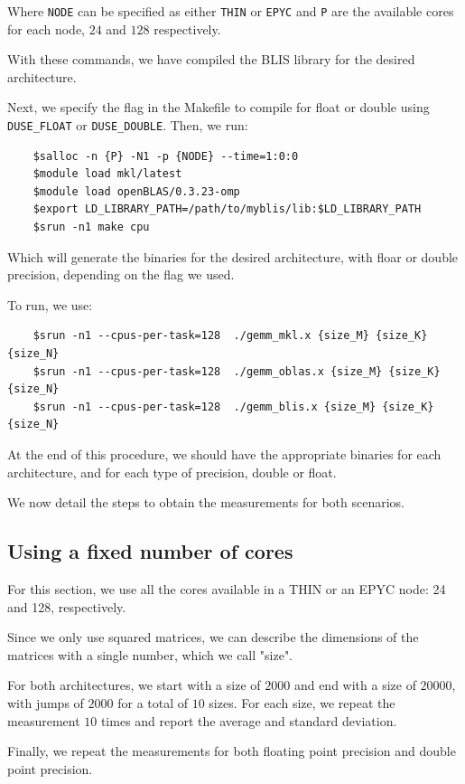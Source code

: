 \documentclass{report}
\begin{document}
Where \texttt{NODE} can be specified as either \texttt{THIN} or \texttt{EPYC} and 
\texttt{P} are the available cores for each node, $24$ and $128$ respectively.

With these commands, we have compiled the BLIS library for the desired 
architecture.

Next, we specify the flag in the Makefile to compile for float or double using 
\texttt{\-DUSE\_FLOAT} or \texttt{\-DUSE\_DOUBLE}. Then, we run:
\begin{verbatim}
    $salloc -n {P} -N1 -p {NODE} --time=1:0:0
    $module load mkl/latest
    $module load openBLAS/0.3.23-omp
    $export LD_LIBRARY_PATH=/path/to/myblis/lib:$LD_LIBRARY_PATH
    $srun -n1 make cpu
\end{verbatim}

Which will generate the binaries for the desired architecture, with floar or 
double precision, depending on the flag we used.

To run, we use: 
\begin{verbatim}
    $srun -n1 --cpus-per-task=128  ./gemm_mkl.x {size_M} {size_K} {size_N}
    $srun -n1 --cpus-per-task=128  ./gemm_oblas.x {size_M} {size_K} {size_N}
    $srun -n1 --cpus-per-task=128  ./gemm_blis.x {size_M} {size_K} {size_N}
\end{verbatim}

At the end of this procedure, we should have the appropriate binaries for each 
architecture, and for each type of precision, double or float.

We now detail the steps to obtain the measurements for both scenarios.

\subsection{Using a fixed number of cores}

For this section, we use all the cores available in a THIN or an EPYC node: 24 
and 128, respectively. 

Since we only use squared matrices, we can describe the dimensions of the matrices 
with a single number, which we call "size". 

For both architectures, we start with a size of $2000$ and end with a size of 
$20000$, with jumps of $2000$ for a total of $10$ sizes. For each size, 
we repeat the measurement $10$ times and report the average and standard 
deviation.

Finally, we repeat the measurements for both floating point precision and double 
point precision.
\end{document}
